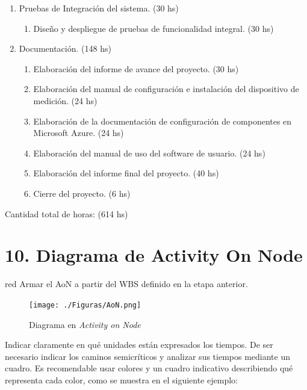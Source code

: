 \documentclass[
11pt, %
]{charter}
\begin{document}
\begin{enumerate}
\item Pruebas de Integración del sistema. (30 hs)
	\begin{enumerate}
	\item Diseño y despliegue de pruebas de funcionalidad integral. (30 hs)
	\end{enumerate}

\item Documentación. (148 hs)
	\begin{enumerate}
	\item Elaboración del informe de avance del proyecto. (30 hs)
	\item Elaboración del manual de configuración e instalación del dispositivo de medición. (24 hs)
	\item Elaboración de la documentación de configuración de componentes en Microsoft Azure. (24 hs)
	\item Elaboración del manual de uso del software de usuario. (24 hs)
	\item Elaboración del informe final del proyecto. (40 hs)
	\item Cierre del proyecto. (6 hs)
	\end{enumerate}
	
\end{enumerate}

Cantidad total de horas: (614 hs)



\section{10. Diagrama de Activity On Node}
\label{sec:AoN}

\begin{consigna}{red}
Armar el AoN a partir del WBS definido en la etapa anterior. 



\end{consigna}

\begin{figure}[htpb]
\centering 
\texttt{[image: ./Figuras/AoN.png]}
\caption{Diagrama en \textit{Activity on Node}}
\label{fig:AoN}
\end{figure}

Indicar claramente en qué unidades están expresados los tiempos.
De ser necesario indicar los caminos semicríticos y analizar sus tiempos mediante un cuadro.
Es recomendable usar colores y un cuadro indicativo describiendo qué representa cada color, como se muestra en el siguiente ejemplo:
\end{document}
